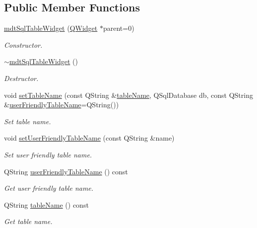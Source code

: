 \subsection*{Public Member Functions}
\begin{DoxyCompactItemize}
\item 
\hyperlink{classmdt_sql_table_widget_a4cf2b0d69608e88d33996148f612e58d}{mdt\-Sql\-Table\-Widget} (\hyperlink{class_q_widget}{Q\-Widget} $\ast$parent=0)
\begin{DoxyCompactList}\small\item\em Constructor. \end{DoxyCompactList}\item 
\hyperlink{classmdt_sql_table_widget_ab5db8a20c64340bba4841a1b1c928d7f}{$\sim$mdt\-Sql\-Table\-Widget} ()
\begin{DoxyCompactList}\small\item\em Destructor. \end{DoxyCompactList}\item 
void \hyperlink{classmdt_sql_table_widget_a36eb282b41ced6d07ffd550594101b23}{set\-Table\-Name} (const Q\-String \&\hyperlink{classmdt_sql_table_widget_a5ebff43d17810531de12c7c3eb208a85}{table\-Name}, Q\-Sql\-Database db, const Q\-String \&\hyperlink{classmdt_sql_table_widget_a3ed02d8946711f9f0f16b55285467839}{user\-Friendly\-Table\-Name}=Q\-String())
\begin{DoxyCompactList}\small\item\em Set table name. \end{DoxyCompactList}\item 
void \hyperlink{classmdt_sql_table_widget_aa4756dd0ac75f70327077696184960cd}{set\-User\-Friendly\-Table\-Name} (const Q\-String \&name)
\begin{DoxyCompactList}\small\item\em Set user friendly table name. \end{DoxyCompactList}\item 
Q\-String \hyperlink{classmdt_sql_table_widget_a3ed02d8946711f9f0f16b55285467839}{user\-Friendly\-Table\-Name} () const 
\begin{DoxyCompactList}\small\item\em Get user friendly table name. \end{DoxyCompactList}\item 
Q\-String \hyperlink{classmdt_sql_table_widget_a5ebff43d17810531de12c7c3eb208a85}{table\-Name} () const 
\begin{DoxyCompactList}\small\item\em Get table name. \end{DoxyCompactList}\item 

\end{DoxyCompactItemize}
